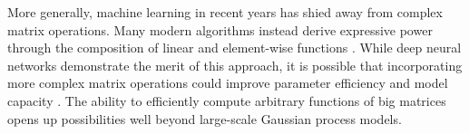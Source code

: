 More generally, machine learning in recent years has shied away from complex matrix operations.
Many modern algorithms instead derive expressive power through the composition of linear and element-wise functions \cite{goodfellow2016deep}.
While deep neural networks demonstrate the merit of this approach, it is possible that incorporating more complex matrix operations could improve parameter efficiency and model capacity \cite{jankowiak2020deep}.
The ability to efficiently compute arbitrary functions of big matrices opens up possibilities well beyond large-scale Gaussian process models.



